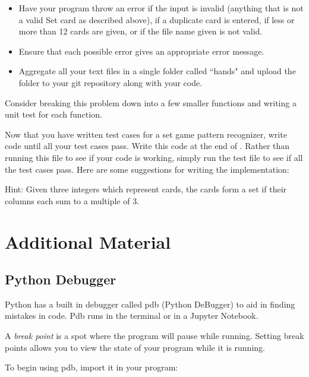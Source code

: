 \begin{problem}
\begin{itemize}
\item Have your program throw an error if the input is invalid (anything that is not a valid Set card as described above),  if a duplicate card is entered, if less or more than 12 cards are given, or if the file name given is not valid.
\item Ensure that each possible error gives an appropriate error message.
\item Aggregate all your text files in a single folder called ``hands" and upload the folder to your git repository along with your code.
\end{itemize}

Consider breaking this problem down into a few smaller functions and writing a unit test for each function.

\end{problem}

\begin{problem}
Now that you have written test cases for a set game pattern recognizer, write code until all your test cases pass. Write this code at the end of . Rather than running this file to see if your code is working, simply run the test file to see if all the test cases pass. Here are some suggestions for writing the implementation:

Hint: Given three integers which represent cards, the cards form a set if their columns each sum to a multiple of 3.

\end{problem}

\section*{Additional Material} %

\subsection*{Python Debugger} %

Python has a built in debugger called pdb (Python DeBugger) to aid in finding mistakes in code.
Pdb runs in the terminal or in a Jupyter Notebook.

A \emph{break point} is a spot where the program will pause while running.
Setting break points allows you to view the state of your program while it is running.

To begin using pdb, import it in your program:

